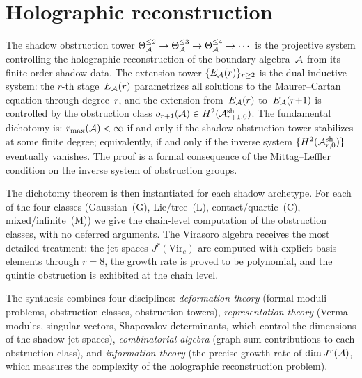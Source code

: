 
\section{Holographic reconstruction}
\label{sec:thqg-holographic-reconstruction}

The shadow obstruction tower
$\Theta_{\mathcal{A}}^{\leq 2} \to \Theta_{\mathcal{A}}^{\leq 3} \to
\Theta_{\mathcal{A}}^{\leq 4} \to \cdots$
is the projective system controlling the holographic
reconstruction of the boundary algebra~$\mathcal{A}$ from its
finite-order shadow data. The extension tower
$\{E_{\mathcal{A}}(r)\}_{r \geq 2}$ is the dual inductive system: the
$r$-th stage~$E_{\mathcal{A}}(r)$ parametrizes all solutions to
the Maurer--Cartan equation through degree~$r$, and the
extension from~$E_{\mathcal{A}}(r)$ to~$E_{\mathcal{A}}(r{+}1)$ is
controlled by the obstruction class
$o_{r+1}(\mathcal{A}) \in H^2(\mathcal{A}^{\mathrm{sh}}_{r+1,0})$.
The fundamental dichotomy is:
$r_{\max}(\mathcal{A}) < \infty$ if and only if the shadow obstruction tower
stabilizes at some finite degree; equivalently, if and only
if the inverse system $\{H^2(\mathcal{A}^{\mathrm{sh}}_{r,0})\}$
eventually vanishes. The proof is a formal consequence of the
Mittag--Leffler condition on the inverse system
of obstruction groups.

The dichotomy theorem is then instantiated for each shadow
archetype. For each of the four classes (Gaussian~(G),
Lie/tree~(L), contact/quartic~(C), mixed/infinite~(M)) we
give the chain-level computation of the obstruction classes,
with no deferred arguments. The Virasoro algebra receives
the most detailed treatment: the jet spaces
$J^r(\mathrm{Vir}_c)$ are computed with explicit basis
elements through $r = 8$, the growth rate is proved to be
polynomial, and the quintic obstruction is exhibited at
the chain level.

The synthesis combines four disciplines:
\emph{deformation theory} (formal moduli problems,
obstruction classes, obstruction towers),
\emph{representation theory} (Verma modules, singular
vectors, Shapovalov determinants, which control the
dimensions of the shadow jet spaces),
\emph{combinatorial algebra} (graph-sum contributions
to each obstruction class), and
\emph{information theory} (the precise growth rate of
$\dim J^r(\mathcal{A})$, which measures the complexity of the
holographic reconstruction problem).

